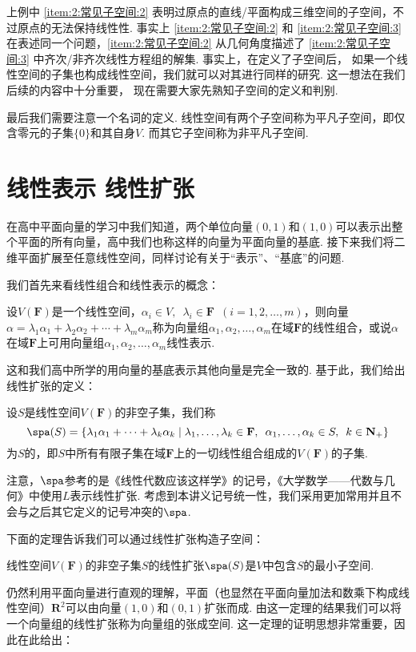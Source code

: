 上例中 \ref*{item:2:常见子空间:2} 表明过原点的直线/平面构成三维空间的子空间，不过原点的无法保持线性性. 事实上 \ref*{item:2:常见子空间:2} 和 \ref*{item:2:常见子空间:3} 在表述同一个问题，\ref*{item:2:常见子空间:2} 从几何角度描述了 \ref*{item:2:常见子空间:3} 中齐次/非齐次线性方程组的解集. 事实上，在定义了子空间后， 如果一个线性空间的子集也构成线性空间，我们就可以对其进行同样的研究. 这一想法在我们后续的内容中十分重要， 现在需要大家先熟知子空间的定义和判别.

最后我们需要注意一个名词的定义. 线性空间有两个子空间称为平凡子空间，即仅含零元的子集$\{0\}$和其自身$V$. 而其它子空间称为非平凡子空间.

\section{线性表示 \quad 线性扩张}

在高中平面向量的学习中我们知道，两个单位向量$(0,1)$和$(1,0)$可以表示出整个平面的所有向量，高中我们也称这样的向量为平面向量的基底. 接下来我们将二维平面扩展至任意线性空间，同样讨论有关于``表示''、``基底''的问题.

我们首先来看线性组合和线性表示的概念：
\begin{definition}
    设$V(\mathbf{F})$是一个线性空间，$\alpha_i\in V,\enspace\lambda_i\in \mathbf{F}\enspace(i=1,2,\ldots,m)$，则向量$\alpha=\lambda_1\alpha_1+\lambda_2\alpha_2+\cdots+\lambda_m\alpha_m$称为向量组$\alpha_1,\alpha_2,\ldots,\alpha_m$在域$\mathbf{F}$的线性组合，或说$\alpha$在域$\mathbf{F}$上可用向量组$\alpha_1,\alpha_2,\ldots,\alpha_m$线性表示.
\end{definition}
这和我们高中所学的用向量的基底表示其他向量是完全一致的. 基于此，我们给出线性扩张的定义：
\begin{definition}[线性扩张] 
    设$S$是线性空间$V(\mathbf{F})$的非空子集，我们称
    \[ \spa(S)=\{\lambda_1\alpha_1+\cdots+\lambda_k\alpha_k \mid \lambda_1,\ldots,\lambda_k\in\mathbf{F},\enspace\alpha_1,\ldots,\alpha_k\in S,\enspace k\in\mathbf{N}_+\} \]
    为$S$的，即$S$中所有有限子集在域$\mathbf{F}$上的一切线性组合组成的$V(\mathbf{F})$的子集.
\end{definition}
注意，$\spa$参考的是《线性代数应该这样学》的记号，《大学数学——代数与几何》中使用$L$表示线性扩张. 考虑到本讲义记号统一性，我们采用更加常用并且不会与之后其它定义的记号冲突的$\spa$.

下面的定理告诉我们可以通过线性扩张构造子空间：
\begin{theorem}\label{thm:2:线性扩张构造子空间}
    线性空间$V(\mathbf{F})$的非空子集$S$的线性扩张$\spa(S)$是$V$中包含$S$的最小子空间.
\end{theorem}
仍然利用平面向量进行直观的理解，平面（也显然在平面向量加法和数乘下构成线性空间）$\mathbf{R}^2$可以由向量$(1,0)$和$(0,1)$扩张而成. 由这一定理的结果我们可以将一个向量组的线性扩张称为向量组的张成空间. 这一定理的证明思想非常重要，因此在此给出：

